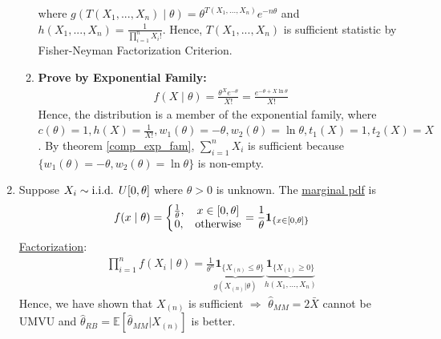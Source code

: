 \documentclass[11pt]{elegantbook}
\begin{document}
\begin{example}
\begin{enumerate}
\begin{enumerate}
            where $g(T(X_1,...,X_n)\mid\theta)=\theta^{T(X_1,...,X_n)} e^{-n\theta}$ and $h(X_1,...,X_n)=\frac{1}{\prod_{i=1}^n X_i!}$. Hence, $T(X_1,...,X_n)$ is sufficient statistic by Fisher-Neyman Factorization Criterion.
            \item \textbf{Prove by Exponential Family:}
            \begin{equation}
                \begin{aligned}
                    f(X\mid\theta)=\frac{\theta^X e^{-\theta}}{X!}=\frac{e^{-\theta+X\ln\theta}}{ X!}
                \end{aligned}
                \nonumber
            \end{equation}
            Hence, the distribution is a member of the exponential family, where $c(\theta)=1,h(X)=\frac{1}{X!}, w_1(\theta)=-\theta,w_2(\theta)=\ln\theta,t_1(X)=1,t_2(X)=X$. By theorem \ref{comp_exp_fam}, $\sum_{i=1}^n X_i$ is sufficient because $\{w_1(\theta)=-\theta,w_2(\theta)=\ln\theta\}$ is non-empty.
        \end{enumerate}
        \item Suppose $X_i\sim \textnormal{i.i.d. } U[0,\theta]$ where $\theta>0$ is unknown. The \underline{marginal pdf} is
        \begin{equation}
            \begin{aligned}
                f(x\mid \theta)=\left\{\begin{matrix}
                    \frac{1}{\theta},&x\in[0,\theta]\\
                    0,&\textnormal{otherwise}
                \end{matrix}\right.=\frac{1}{\theta}\mathbf{1}_{\{x\in[0,\theta]\}}
            \end{aligned}
            \nonumber
        \end{equation}
        \underline{Factorization}:
        \begin{equation}
            \begin{aligned}
                \prod_{i=1}^n f(X_i\mid \theta)=\underbrace{\frac{1}{\theta^n}\mathbf{1}_{\{X_{(n)}\leq \theta\}}}_{g(X_{(n)}|\theta)} \underbrace{\mathbf{1}_{\{X_{(1)}\geq 0\}}}_{h(X_1,...,X_n)}
            \end{aligned}
            \nonumber
        \end{equation}
        Hence, we have shown that $X_{(n)}$ is sufficient $\Rightarrow$ $\hat{\theta}_{MM}=2\bar{X}$ cannot be UMVU and $\hat{\theta}_{RB}=\mathbb{E}[\hat{\theta}_{MM}|X_{(n)}]$ is better.
    \end{enumerate}
\end{example}
\end{document}
